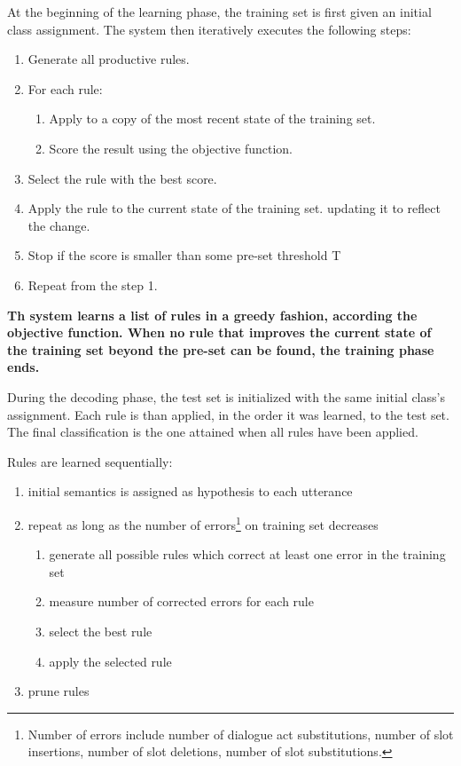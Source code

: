 \documentclass[11pt]{article}
\begin{document}
At the beginning of the learning phase, the training set is first given an initial class assignment. The system then iteratively executes the following steps:

\begin{enumerate}
  \item Generate all productive rules.
  \item For each rule:
  \begin{enumerate}
    \item Apply to a copy of the most recent state of the training set.
    \item Score the result using the objective function.
  \end{enumerate}
  \item Select the rule with the best score.
  \item Apply the rule  to the current state of the training set. updating it to reflect the change.
  \item Stop if the score is smaller than some pre-set threshold T
  \item Repeat from the step 1.
\end{enumerate}

\textbf{Th system learns a list of rules in a greedy fashion, according the objective function. When no rule that improves the current state of the training set beyond the pre-set can be found, the training phase ends.}

During the decoding phase, the test set is initialized with the same initial class's assignment. Each rule is than applied, in the order it was learned, to the test set. The final classification is the one attained when all rules have been applied.


Rules are learned sequentially:
\begin{enumerate}
  \item initial semantics is assigned as hypothesis to each utterance
  \item repeat as long as the number of errors\footnote{Number of errors include number of dialogue act substitutions, number of slot insertions, number of slot deletions, number of slot substitutions.} on training set decreases
  \begin{enumerate}
    \item generate all possible rules which correct at least one error in the training set
    \item measure number of corrected errors for each rule
    \item select the best rule
    \item apply the selected rule
  \end{enumerate}
  \item prune rules
\end{enumerate}
\end{document}
